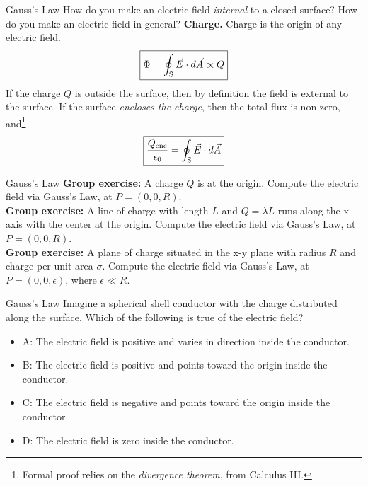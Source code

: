 \documentclass{beamer}
\begin{document}
\begin{frame}{Gauss's Law}
How do you make an electric field \textit{internal} to a closed surface?  How do you make an electric field in general?  \textbf{Charge.}  Charge is the origin of any electric field.
\begin{equation}
\boxed{
\Phi = \oint_{\rm S} \vec{E} \cdot d\vec{A} \propto Q} \label{eq:general2}
\end{equation}
If the charge $Q$ is outside the surface, then by definition the field is external to the surface.  If the surface \textit{encloses the charge}, then the total flux is non-zero, and\footnote{Formal proof relies on the \textit{divergence theorem}, from Calculus III.}
\begin{equation}
\boxed{
\frac{Q_{\rm enc}}{\epsilon_0} = \oint_{\rm S} \vec{E} \cdot d\vec{A}} \label{eq:gauss}
\end{equation}
\end{frame}

\begin{frame}{Gauss's Law}
\textbf{Group exercise:} A charge $Q$ is at the origin.  Compute the electric field via Gauss's Law, at $P = (0,0,R)$. \\ \vspace{0.5cm}
\textbf{Group exercise:} A line of charge with length $L$ and $Q = \lambda L$ runs along the x-axis with the center at the origin.  Compute the electric field via Gauss's Law, at $P = (0,0,R)$. \\ \vspace{0.5cm}
\textbf{Group exercise:} A plane of charge situated in the x-y plane with radius $R$ and charge per unit area $\sigma$.  Compute the electric field via Gauss's Law, at $P = (0,0,\epsilon)$, where $\epsilon \ll R$. \\ \vspace{0.5cm}
\end{frame}

\begin{frame}{Gauss's Law}
Imagine a spherical shell conductor with the charge distributed along the surface.  Which of the following is true of the electric field?
\begin{itemize}
\item A: The electric field is positive and varies in direction inside the conductor.
\item B: The electric field is positive and points toward the origin inside the conductor.
\item C: The electric field is negative and points toward the origin inside the conductor.
\item D: The electric field is zero inside the conductor.
\end{itemize}
\end{frame}
\end{document}
